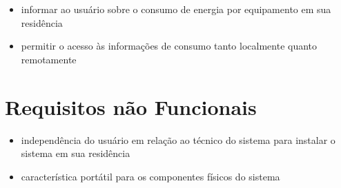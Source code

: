 \begin{itemize}
	\item{informar ao usuário sobre o consumo de energia por equipamento em sua residência}
  \item{permitir o acesso às informações de consumo tanto localmente quanto remotamente}
\end{itemize}

\section{Requisitos não Funcionais}

\begin{itemize}
	\item{independência do usuário em relação ao técnico do sistema para instalar o sistema em sua residência}
	\item{característica portátil para os componentes físicos do sistema}
\end{itemize}

